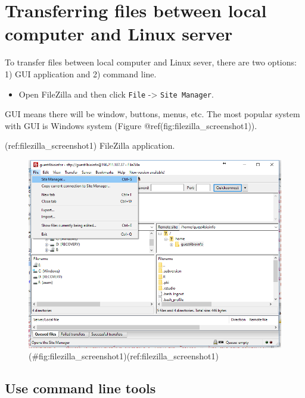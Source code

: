 \documentclass[]{book}
\providecommand{\tightlist}{%
  \setlength{\itemsep}{0pt}\setlength{\parskip}{0pt}}
\begin{document}
\hypertarget{transferring-files-between-local-computer-and-linux-server}{%
\section{Transferring files between local computer and Linux server}\label{transferring-files-between-local-computer-and-linux-server}}

To transfer files between local computer and Linux sever, there are two options: 1) GUI application and 2) command line.

\begin{itemize}
\tightlist
\item
  Open FileZilla and then click \texttt{File} -\textgreater{} \texttt{Site\ Manager}.
\end{itemize}

GUI means there will be window, buttons, menus, etc. The most popular system with GUI is Windows system (Figure @ref(fig:filezilla\_screenshot1)).

(ref:filezilla\_screenshot1) FileZilla application.

\begin{figure}
\centering
\includegraphics{figures/filezilla_screenshot1.png}
\caption{(\#fig:filezilla\_screenshot1)(ref:filezilla\_screenshot1)}
\end{figure}

\hypertarget{use-command-line-tools}{%
\subsection{Use command line tools}\label{use-command-line-tools}}
\end{document}
